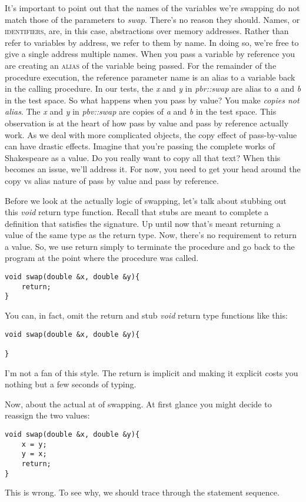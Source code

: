\documentclass[nobib]{tufte-handout}
\begin{document}
It's important to point out that the names of the variables we're swapping do not match those of the parameters to \textit{swap}. There's no reason they should. Names, or \textsc{identifiers}, are, in this case, abstractions over memory addresses. Rather than refer to variables by address, we refer to them by name. In doing so, we're free to give a single address multiple names. When you pass a variable by reference you are creating an \textsc{alias} of the variable being passed. For the remainder of the procedure execution, the reference parameter name is an alias to a variable back in the calling procedure. In our tests, the \textit{x} and \textit{y} in \textit{pbr::swap} are alias to \textit{a} and \textit{b} in the test space. So what happens when you pass by value? You make \textit{copies not alias}. The \textit{x} and \textit{y} in \textit{pbv::swap} are copies of \textit{a} and \textit{b} in the test space. This observation is at the heart of how pass by value and pass by reference actually work. As we deal with more complicated objects, the copy effect of pass-by-value can have drastic effects. Imagine that you're passing the complete works of Shakespeare as a value. Do you really want to copy all that text? When this becomes an issue, we'll address it. For now, you need to get your head around the copy vs alias nature of pass by value and pass by reference.

Before we look at the actually logic of swapping, let's talk about stubbing out this \textit{void} return type function. Recall that stubs are meant to complete a definition that satisfies the signature. Up until now that's meant returning a value of the same type as the return type.  Now, there's no requirement to return a value.  So, we use return simply to terminate the procedure and go back to the program at the point where the procedure was called.
\begin{verbatim}
void swap(double &x, double &y){
	return;
}
\end{verbatim}
You can, in fact, omit the return and stub \textit{void} return type functions like this:
\begin{verbatim}
void swap(double &x, double &y){

}
\end{verbatim}
I'm not a fan of this style.  The return is implicit and making it explicit costs you nothing but a few seconds of typing. 

Now, about the actual at of swapping.  At first glance you might decide to reassign the two values:
\begin{verbatim}
void swap(double &x, double &y){
	x = y;
	y = x;
	return;
}
\end{verbatim}
This is wrong. To see why, we should trace through the statement sequence. 
\end{document}
